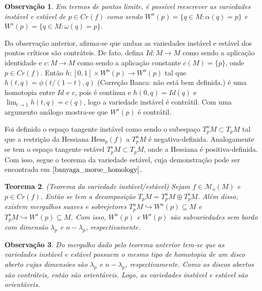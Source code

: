 \documentclass[12pt]{book}
\newtheorem{teorema}{Teorema}[section]
\newtheorem{observacao}[teorema]{Observação}
\newcommand{\espacotangentevariedadeestavel}{T^{s}_{p}M}
\newcommand{\espacotangentevariedadeinstavel}{T^{u}_{p}M}
\newcommand{\espacotangenteponto}[2]{T_{#1}#2}
\newcommand{\espacotangentevariedade}{\espacotangenteponto{p}{M}}
\newcommand{\funcoesmorse}[1]{\mathcal{M}_{o}(#1)}
\newcommand{\hessianaponto}[2]{\text{Hess}_{#1}(#2)}
\newcommand{\intervalo}{[0,1]}
\newcommand{\pontoscriticos}[1]{\textit{Cr}(#1)}
\newcommand{\variedadeestavel}[1]{W^{s}(#1)}
\newcommand{\variedadeinstavel}[1]{W^{u}(#1)}
\newcommand{\alerta}[1]{{\color{red}#1}}
\newcommand{\correcaobanca}[1]{\alerta{(Correção Banca: #1)}}
\begin{document}
	\begin{observacao}
		Em termos de pontos limite, é possível reescrever as variedades instável e estável de $p \in \pontoscriticos{f}$ como sendo $\variedadeinstavel{p} = \{q\in M: \alpha(q)=p\}$ e $\variedadeestavel{p} = \{q\in M: \omega(q)=p\}$.
	\end{observacao}
	
	Da observação anterior, afirma-se que ambas as variedades instável e estável dos pontos críticos são contráteis. De fato, defina $Id: M\to M$ como sendo a aplicação identidade e $c:M\to M$ como sendo a aplicação constante $c(M) =\{p\} $, onde $p \in \pontoscriticos{f}$. Então $h:\intervalo\times \variedadeinstavel{p} \to \variedadeinstavel{p}$ tal que \alerta{$h(t,q) = \phi(t/(1-t), q)$} \correcaobanca{não está bem definida.} é uma homotopia entre $Id$ e $c$, pois é contínua e $h(0, q) = Id(q)$ e $\lim_{t \to 1}h(t, q) = c(q)$, logo a variedade instável é contrátil. Com uma argumento análogo mostra-se que $\variedadeestavel{p}$ é contrátil.
	
	Foi definido o espaço tangente instável como sendo o subespaço $\espacotangentevariedadeinstavel\subset \espacotangentevariedade$ tal que a restrição da Hessiana $\hessianaponto{p}{f}$ a $\espacotangentevariedadeinstavel$ é negativa-definida. Analogamente se tem o espaço tangente estável $\espacotangentevariedadeestavel \subset \espacotangentevariedade$, onde a Hessiana é positiva-definida. Com isso, segue o teorema da variedade estável, cuja demonstração pode ser encontrada em $\cite{banyaga_morse_homology}$.
	
	\begin{teorema}\label{teorema_variedade_instavel_estavel}
		(Teorema da variedade instável/estável) Sejam $f \in \funcoesmorse{M}$ e $p \in \pontoscriticos{f}$. Então se tem a decomposição $\espacotangentevariedade=\espacotangentevariedadeinstavel\oplus\espacotangentevariedadeestavel$. Além disso, existem mergulhos suaves e sobrejetores $\espacotangentevariedadeinstavel \hookrightarrow \variedadeinstavel{p} \subseteq M$ e $\espacotangentevariedadeestavel \hookrightarrow \variedadeestavel{p} \subseteq M$. Com isso, $\variedadeinstavel{p}$ e $\variedadeestavel{p}$ são subvariedades sem bordo com dimensão $\lambda_{p}$ e $n-\lambda_{p}$, respectivamente.
	\end{teorema}
	
	\begin{observacao}\label{observacao_orientacao_variedade_instavel}
		Do mergulho dado pelo teorema anterior tem-se que as variedades instável e estável possuem o mesmo tipo de homotopia de um disco aberto cujas dimensões são $\lambda_{p}$ e $n-\lambda_{p}$, respectivamente. Como os discos abertos são contráteis, então são orientáveis. Logo, as variedades instável e estável são orientáveis.
	\end{observacao}
\end{document}
